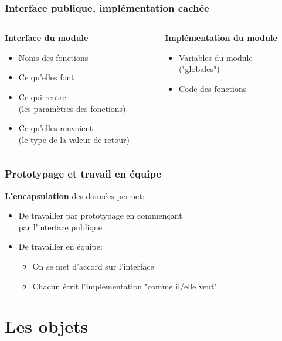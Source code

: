 \documentclass{beamer}
\begin{document}
\begin{frame}
\frametitle {Interface publique, implémentation cachée}

\begin{columns}[t]

\begin{column}{6cm}
\textbf{Interface du module}
\begin{itemize}
  \item{Noms des fonctions}
  \item{Ce qu'elles font}
  \item{Ce qui rentre \\ (les paramètres des fonctions)}
  \item{Ce qu'elles renvoient \\ (le type de la valeur de retour)}
\end{itemize}
\end{column}

\begin{column}{6cm}
\textbf{Implémentation du module}
\begin{itemize}
  \item{Variables du module \\ ("globales")}
  \item{Code des fonctions}
\end{itemize}
\end{column}

\end{columns}

\end{frame}
  
\begin{frame}
\frametitle {Prototypage et travail en équipe}
\textbf{L'encapsulation} des données permet:
\begin{itemize}
  \item De travailler \alert{par prototypage} en commençant \\ par l'interface publique
  \item De travailler en équipe:
  \begin{itemize}
    \item On se met d'accord \alert{sur l'interface}
    \item Chacun écrit l'implémentation \alert{"comme il/elle veut"}
  \end{itemize}
\end{itemize}
\end{frame}

\section{Les objets}
\end{document}
